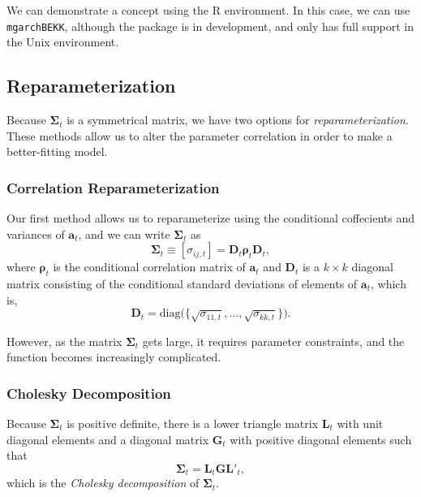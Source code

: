 We can demonstrate a concept using the R environment. In this case, we can use \texttt{mgarchBEKK}, although the package is in development, and only has full support in the Unix environment.

\subsection{Reparameterization}
Because $\mathbf{\Sigma}_t$ is a symmetrical matrix, we have two options for \emph{reparameterization}. These methods allow us to alter the parameter correlation in order to make a better-fitting model.

\subsubsection{Correlation Reparameterization}
Our first method allows us to reparameterize using the conditional coffecients and variances of $\mathbf{a}_t$, and we can write $\mathbf{\Sigma}_t$ as
\[
\mathbf{\Sigma}_t \equiv [\sigma_{ij,t}] = \mathbf{D}_t \mathbf{\rho}_t \mathbf{D}_t,
\]
where $\mathbf{\rho}_t$ is the conditional correlation matrix of $\mathbf{a}_t$ and $\mathbf{D}_t$ is a $k \times k$ diagonal matrix consisting of the conditional standard deviations of elements of $\mathbf{a}_t$, which is,
\[
\mathbf{D}_t = \text{diag}\Big( \{\sqrt{\sigma_{11,t}}, \ldots, \sqrt{\sigma_{kk,t}} \} \Big).
\]

However, as the matrix $\mathbf{\Sigma}_t$ gets large, it requires parameter constraints, and the function becomes increasingly complicated.

\subsubsection{Cholesky Decomposition}
Because $\mathbf{\Sigma}_t$ is positive definite, there is a lower triangle matrix $\mathbf{L}_t$ with unit diagonal elements and a diagonal matrix $\mathbf{G}_t$ with positive diagonal elements such that
\begin{equation}
\mathbf{\Sigma}_t = \mathbf{L}_t \mathbf{G}\mathbf{L}'_t,
\label{eq:cholesky-decomp}
\end{equation}
which is the \emph{Cholesky decomposition} of $\mathbf{\Sigma}_t$.



